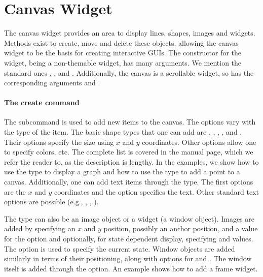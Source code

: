 \section{Canvas Widget}
\label{sec:tcltk:canvas-widget}

 
The canvas widget provides an area to display lines, shapes, images and widgets. Methods exist to create, move and delete these objects, allowing the canvas widget to be the basis for creating interactive GUIs. The constructor  for the widget, being a non-themable widget, has many arguments. We mention the standard ones , , and . Additionally, the canvas is a scrollable widget, so has the corresponding arguments  and .


\paragraph{The create command}
The subcommand  is used
to add new items to the canvas. The options vary with the type of the
item. The basic shape types that one can add are ,
, , , and
. Their options specify the size using $x$ and $y$
coordinates. Other options allow one to specify colors, etc. The
complete list is covered in the  manual page, which we
refer the reader to, as the description is lengthy.  In the examples,
we show how to use the  type to display a graph and how to
use the  type to add a point to a canvas. Additionally,
one can add text items through the  type. The first
options are the $x$ and $y$ coordinates and the  option
specifies the text.  Other standard text options are possible (e.g.,
, , ).

The type can also be an image object or a widget (a window object). Images are added by specifying an $x$ and $y$ position, possibly an anchor position, and a value for the  option and optionally, for state dependent display, specifying  and  values. The  option is used to specify the current state. Window objects are added similarly in terms of their positioning, along with options for  and . The window itself is added through the  option. An example shows how to add a frame widget.

